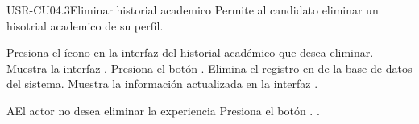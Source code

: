 \begin{UseCase}[]{USR-CU04.3}{Eliminar historial academico}{
	Permite al candidato eliminar un hisotrial academico de su perfil.
}
\end{UseCase}

\begin{UCtrayectoria}
	\UCpaso [\UCactor] Presiona el ícono \IUEliminar{} en la interfaz  del historial académico que desea eliminar.
	\UCpaso Muestra la interfaz .
	\UCpaso [\UCsist] Presiona el botón .
	\UCpaso Elimina el registro en de la base de datos del sistema.
	\UCpaso Muestra la información actualizada en la interfaz . 
\end{UCtrayectoria}

\begin{UCtrayectoriaA}{A}{El actor no desea eliminar la experiencia}
	\UCpaso [\UCsist] Presiona el botón .
	.
\end{UCtrayectoriaA} 
